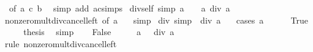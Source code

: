 \begin{isabellebody}
\ {\isacharasterisk}{\kern0pt}\ {\isacharbrackleft}{\kern0pt}of\ a\ c\ b{\isacharbrackright}{\kern0pt}\ \isamarkupfalse%
\ {\isacharparenleft}{\kern0pt}simp\ add{\isacharcolon}{\kern0pt}\ ac{\isacharunderscore}{\kern0pt}simps{\isacharparenright}{\kern0pt}\isanewline
{}\isamarkupfalse%
%
\endisatagproof
{\isafoldproof}%
%
\isadelimproof
\isanewline
%
\endisadelimproof
\isanewline
{}\isamarkupfalse%
\ div{\isacharunderscore}{\kern0pt}self\ {\isacharbrackleft}{\kern0pt}simp{\isacharbrackright}{\kern0pt}{\isacharcolon}{\kern0pt}\ {\isachardoublequoteopen}a\ {\isasymnoteq}\ {}\ {\isasymLongrightarrow}\ a\ div\ a\ {\isacharequal}{\kern0pt}\ {}{\isachardoublequoteclose}\isanewline
%
\isadelimproof
\ \ %
\endisadelimproof
%
\isatagproof
{}\isamarkupfalse%
\ nonzero{\isacharunderscore}{\kern0pt}mult{\isacharunderscore}{\kern0pt}div{\isacharunderscore}{\kern0pt}cancel{\isacharunderscore}{\kern0pt}left\ {\isacharbrackleft}{\kern0pt}of\ a\ {}{\isacharbrackright}{\kern0pt}\ \isamarkupfalse%
\ simp%
\endisatagproof
{\isafoldproof}%
%
\isadelimproof
\isanewline
%
\endisadelimproof
\isanewline
{}\isamarkupfalse%
\ div{\isacharunderscore}{\kern0pt}{}\ {\isacharbrackleft}{\kern0pt}simp{\isacharbrackright}{\kern0pt}{\isacharcolon}{\kern0pt}\ {\isachardoublequoteopen}{}\ div\ a\ {\isacharequal}{\kern0pt}\ {}{\isachardoublequoteclose}\isanewline
%
\isadelimproof
%
\endisadelimproof
%
\isatagproof
{}\isamarkupfalse%
\ {\isacharparenleft}{\kern0pt}cases\ {\isachardoublequoteopen}a\ {\isacharequal}{\kern0pt}\ {}{\isachardoublequoteclose}{\isacharparenright}{\kern0pt}\isanewline
\ \ \isamarkupfalse%
\ True\isanewline
\ \ \isamarkupfalse%
\ \isamarkupfalse%
\ {\isacharquery}{\kern0pt}thesis\ \isamarkupfalse%
\ simp\isanewline
{}\isamarkupfalse%
\isanewline
\ \ \isamarkupfalse%
\ False\isanewline
\ \ \isamarkupfalse%
\ \isamarkupfalse%
\ {\isachardoublequoteopen}a\ {\isacharasterisk}{\kern0pt}\ {}\ div\ a\ {\isacharequal}{\kern0pt}\ {}{\isachardoublequoteclose}\isanewline
\ \ \ \ \isamarkupfalse%
\ {\isacharparenleft}{\kern0pt}rule\ nonzero{\isacharunderscore}{\kern0pt}mult{\isacharunderscore}{\kern0pt}div{\isacharunderscore}{\kern0pt}cancel{\isacharunderscore}{\kern0pt}left{\isacharparenright}{\kern0pt}\isanewline
\ \ \isamarkupfalse%

\end{isabellebody}
